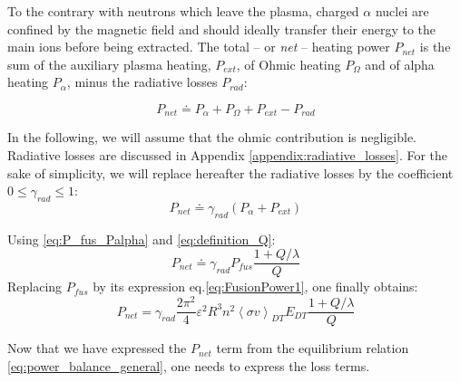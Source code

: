 To the contrary with neutrons which leave the plasma, charged $\alpha$ nuclei are confined by the magnetic field and should ideally transfer their energy to the main ions before being extracted. The total -- or \emph{net} -- heating power $P_{net}$ is the sum of the auxiliary plasma heating,  $P_{ext}$, of Ohmic heating $P_\Omega$ and of alpha heating $P_\alpha$, minus the radiative losses $P_{rad}$:

\begin{equation}
	P_{net} 
	\doteq 
	P_\alpha + P_\Omega + P_{ext} - P_{rad}
\label{eq:definition_net_power}
\end{equation}

In the following, we will assume that the ohmic contribution is negligible. Radiative losses are discussed in Appendix \ref{appendix:radiative_losses}. For the sake of simplicity, we will replace hereafter the radiative losses by the coefficient $0\leq \gamma_{rad} \leq1$:
\begin{equation*}
P_{net} \doteq \gamma_{rad} (P_\alpha + P_{ext})
\end{equation*}

Using \ref{eq:P_fus_Palpha} and \ref{eq:definition_Q}:
\begin{equation}
\boxed{
	P_{net} 
	\doteq 
	\gamma_{rad}
	P_{fus}
	\frac{1 + Q/\lambda}{Q}
}
\label{eq:Pnet_as_Pfus_Q}
\end{equation}
Replacing $P_{fus}$ by its expression eq.\ref{eq:FusionPower1}, one finally obtains:
\begin{equation}
\boxed{
	P_{net} 
	= 
	\gamma_{rad}
	\frac{2\pi^2}{4}
	\varepsilon^2 R^3
	n^2 \left< \sigma v \right>_{DT} E_{DT}
	\frac{1+Q/\lambda}{Q}
 }
\label{eq:Pnet_QnTR_adv}
\end{equation}

Now that we have expressed the $P_{net}$ term from the equilibrium relation \ref{eq:power_balance_general}, one needs to express the loss terms.

